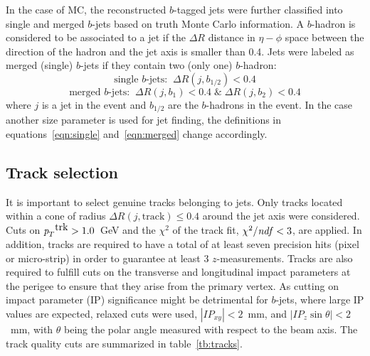 In the case of MC, the reconstructed $b$-tagged jets were further classified into single and merged $b$-jets based on truth Monte Carlo information. A $b$-hadron is considered to be associated to a jet if the $\Delta R$ distance in $\eta-\phi$ space between the direction of the hadron and the jet axis is smaller than 0.4. Jets were labeled as merged (single) $b$-jets if they contain two (only one) $b$-hadron:%
\begin{equation}
\mbox{single $b$-jets:} \; \; \Delta R(j,b_{1/2}) < 0.4
\label{eqn:single}
\end{equation}
\begin{equation}
\mbox{merged $b$-jets:}  \; \; \Delta R(j,b_1) < 0.4 \; \& \;  \Delta R(j,b_2) < 0.4
\label{eqn:merged}
\end{equation}
%
where $j$ is a jet in the event and $b_{1/2}$ are the $b$-hadrons in the event. In the case another size parameter is used for jet finding, the definitions in equations~\ref{eqn:single} and~\ref{eqn:merged} change accordingly.


\subsection{Track selection }\label{sec:TrackSelection}

It is important to select genuine tracks belonging to jets. Only tracks located  within a cone of radius $\Delta R(j,\mbox{track}) \leq 0.4$ around the jet axis were considered. %
  Cuts on ${\emph{p}_{T}}^{\mbox{trk}}>1.0$~GeV and the $\chi^2$ of the track fit, $\chi^2/{\it ndf}<3$, are applied. %
 In addition, tracks are required to have a total of at least seven precision hits (pixel or micro-strip) in order to guarantee at least 3 $z$-measurements. Tracks are also required to fulfill cuts on the transverse and longitudinal impact parameters at the perigee to ensure that they arise from  the primary vertex. As cutting on impact parameter (IP) significance might be detrimental for $b$-jets, where large IP values are expected, relaxed cuts were used, $|IP_{xy}|<2$~mm, and $|IP_{z}\sin\theta|<2$~mm, with $\theta$ being the polar angle measured with respect to the beam axis. The track quality cuts are summarized in table~\ref{tb:tracks}. %


